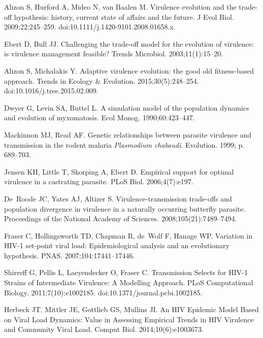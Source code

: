 \documentclass[10pt,letterpaper]{article}
\begin{document}
\begin{thebibliography}{10}

Alizon S, Hurford A, Mideo N, van Baalen M.
\newblock Virulence evolution and the trade-off hypothesis: history, current
  state of affairs and the future.
\newblock J Evol Biol. 2009;22:245--259.
\newblock doi:{10.1111/j.1420-9101.2008.01658.x}.

Ebert D, Bull JJ.
\newblock Challenging the trade-off model for the evolution of virulence: is
  virulence management feasible?
\newblock Trends Microbiol. 2003;11(1):15--20.

Alizon S, Michalakis Y.
\newblock Adaptive virulence evolution: the good old fitness-based approach.
\newblock Trends in Ecology \& Evolution. 2015;30(5):248--254.
\newblock doi:{10.1016/j.tree.2015.02.009}.

Dwyer G, Levin SA, Buttel L.
\newblock A simulation model of the population dynamics and evolution of
  myxomatosis.
\newblock Ecol Monog. 1990;60:423--447.

Mackinnon MJ, Read AF.
\newblock Genetic relationships between parasite virulence and transmission in
  the rodent malaria {{\em Plasmodium chabaudi}}.
\newblock Evolution. 1999; p. 689--703.

Jensen KH, Little T, Skorping A, Ebert D.
\newblock Empirical support for optimal virulence in a castrating parasite.
\newblock PLoS Biol. 2006;4(7):e197.

De~Roode JC, Yates AJ, Altizer S.
\newblock Virulence-transmission trade-offs and population divergence in
  virulence in a naturally occurring butterfly parasite.
\newblock Proceedings of the National Academy of Sciences.
  2008;105(21):7489--7494.

Fraser C, Hollingsworth TD, Chapman R, de~Wolf F, Hanage WP.
\newblock Variation in {HIV}-1 set-point viral load: Epidemiological analysis
  and an evolutionary hypothesis.
\newblock PNAS. 2007;104:17441--17446.

Shirreff G, Pellis L, Laeyendecker O, Fraser C.
\newblock Transmission Selects for {HIV-1} Strains of Intermediate Virulence: A
  Modelling Approach.
\newblock PLoS Computational Biology. 2011;7(10):e1002185.
\newblock doi:{10.1371/journal.pcbi.1002185}.

Herbeck JT, Mittler JE, Gottlieb GS, Mullins JI.
\newblock An {HIV} Epidemic Model Based on Viral Load Dynamics: Value in
  Assessing Empirical Trends in {HIV} Virulence and Community Viral Load.
 Comput Biol. 2014;10(6):e1003673.


\end{thebibliography}
\end{document}

